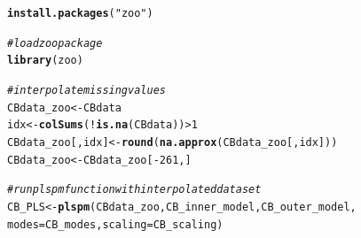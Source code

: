 \documentclass{article}\usepackage[]{graphicx}\usepackage[]{color}
\makeatletter
\newcommand{\hlnum}[1]{\textcolor[rgb]{0.686,0.059,0.569}{#1}}%
\newcommand{\hlstr}[1]{\textcolor[rgb]{0.192,0.494,0.8}{#1}}%
\newcommand{\hlcom}[1]{\textcolor[rgb]{0.678,0.584,0.686}{\textit{#1}}}%
\newcommand{\hlopt}[1]{\textcolor[rgb]{0,0,0}{#1}}%
\newcommand{\hlstd}[1]{\textcolor[rgb]{0.345,0.345,0.345}{#1}}%
\newcommand{\hlkwb}[1]{\textcolor[rgb]{0.69,0.353,0.396}{#1}}%
\newcommand{\hlkwc}[1]{\textcolor[rgb]{0.333,0.667,0.333}{#1}}%
\newcommand{\hlkwd}[1]{\textcolor[rgb]{0.737,0.353,0.396}{\textbf{#1}}}%
\newenvironment{kframe}{%
 \def\at@end@of@kframe{}%
 \ifinner\ifhmode%
  \def\at@end@of@kframe{\end{minipage}}%
  \begin{minipage}{\columnwidth}%
 \fi\fi%
 \def\FrameCommand##1{\hskip\@totalleftmargin \hskip-\fboxsep
 \colorbox{shadecolor}{##1}\hskip-\fboxsep
     \hskip-\linewidth \hskip-\@totalleftmargin \hskip\columnwidth}%
 \MakeFramed {\advance\hsize-\width
   \@totalleftmargin\z@ \linewidth\hsize
   \@setminipage}}%
 {\par\unskip\endMakeFramed%
 \at@end@of@kframe}
\newenvironment{knitrout}{}{} %
\makeatother
\begin{document}
\begin{knitrout}
\color{fgcolor}\begin{kframe}
\begin{alltt}
\hlkwd{install.packages}\hlstd{(}\hlstr{"zoo"}\hlstd{)}
\end{alltt}
\end{kframe}
\end{knitrout}

\begin{knitrout}
\color{fgcolor}\begin{kframe}
\begin{alltt}
\hlcom{#load zoo package}
\hlkwd{library}\hlstd{(zoo)}

\hlcom{#interpolate missing values}
\hlstd{CBdata_zoo} \hlkwb{<-} \hlstd{CBdata}
\hlstd{idx} \hlkwb{<-} \hlkwd{colSums}\hlstd{(}\hlopt{!}\hlkwd{is.na}\hlstd{(CBdata))} \hlopt{>} \hlnum{1}
\hlstd{CBdata_zoo[ , idx]} \hlkwb{<-} \hlkwd{round}\hlstd{(}\hlkwd{na.approx}\hlstd{(CBdata_zoo[ , idx]))}
\hlstd{CBdata_zoo} \hlkwb{<-} \hlstd{CBdata_zoo[}\hlopt{-}\hlnum{261}\hlstd{,]}

\hlcom{#run plspm function with interpolated dataset}
\hlstd{CB_PLS} \hlkwb{<-} \hlkwd{plspm}\hlstd{(CBdata_zoo,CB_inner_model,CB_outer_model,}
                \hlkwc{modes} \hlstd{= CB_modes,} \hlkwc{scaling} \hlstd{= CB_scaling)}


\end{alltt}
\end{kframe}
\end{knitrout}
\end{document}
